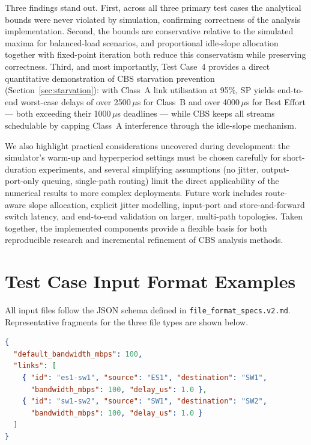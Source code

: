 \documentclass[11pt,a4paper]{article}
\begin{document}
Three findings stand out.
First, across all three primary test cases the analytical bounds were never
violated by simulation, confirming correctness of the analysis implementation.
Second, the bounds are conservative relative to the simulated maxima for
balanced-load scenarios, and proportional idle-slope allocation together with
fixed-point iteration both reduce this conservatism while preserving
correctness.
Third, and most importantly, Test Case~4 provides a direct quantitative
demonstration of CBS starvation prevention (Section~\ref{sec:starvation}):
with Class~A link utilisation at 95\%, SP yields end-to-end worst-case delays
of over 2500\,$\mu$s for Class~B and over 4000\,$\mu$s for Best Effort ---
both exceeding their 1000\,$\mu$s deadlines --- while CBS keeps all streams
schedulable by capping Class~A interference through the idle-slope mechanism.

We also highlight practical considerations uncovered during development:
the simulator's warm-up and hyperperiod settings must be chosen carefully for
short-duration experiments, and several simplifying assumptions (no jitter,
output-port-only queuing, single-path routing) limit the direct applicability
of the numerical results to more complex deployments. Future work includes
route-aware slope allocation, explicit jitter modelling, input-port and
store-and-forward switch latency, and end-to-end validation on larger,
multi-path topologies. Taken together, the implemented components provide a
flexible basis for both reproducible research and incremental refinement of
CBS analysis methods.

\appendix
\section{Test Case Input Format Examples}
\label{app:formats}

All input files follow the JSON schema defined in
\texttt{file\_format\_specs.v2.md}.
Representative fragments for the three file types are shown below.

\begin{lstlisting}[language=json, caption={Topology file fragment.}]
{
  "default_bandwidth_mbps": 100,
  "links": [
    { "id": "es1-sw1", "source": "ES1", "destination": "SW1",
      "bandwidth_mbps": 100, "delay_us": 1.0 },
    { "id": "sw1-sw2", "source": "SW1", "destination": "SW2",
      "bandwidth_mbps": 100, "delay_us": 1.0 }
  ]
}
\end{lstlisting}
\end{document}
